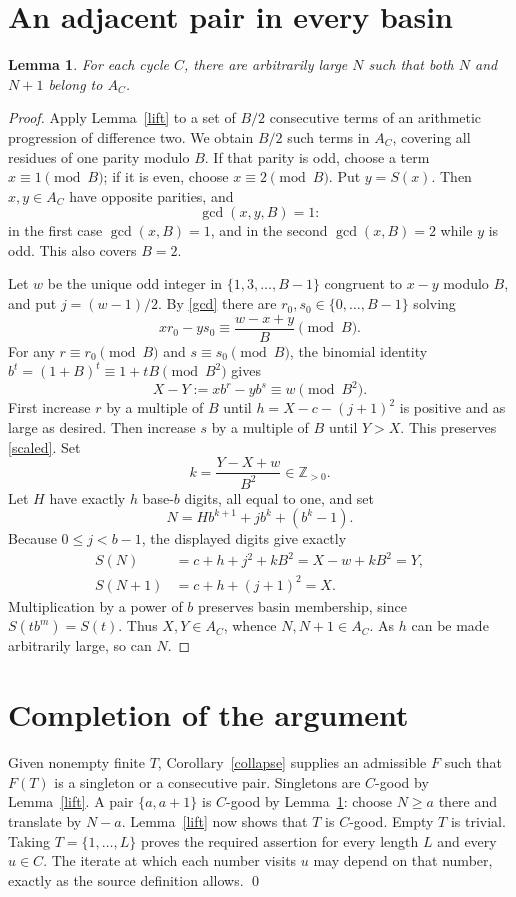 \documentclass[11pt]{article}
\newtheorem{lemma}{Lemma}
\begin{document}
\section*{An adjacent pair in every basin}
\begin{lemma}\label{seed}
For each cycle $C$, there are arbitrarily large $N$ such that both
$N$ and $N+1$ belong to $A_C$.
\end{lemma}
\begin{proof}
Apply Lemma~\ref{lift} to a set of $B/2$ consecutive terms of an
arithmetic progression of difference two. We obtain $B/2$ such terms
in $A_C$, covering all residues of one parity modulo $B$. If that
parity is odd, choose a term $x\equiv1\pmod B$; if it is even, choose
$x\equiv2\pmod B$. Put $y=S(x)$. Then $x,y\in A_C$ have opposite
parities, and
\begin{equation}\label{gcd}
\gcd(x,y,B)=1:
\end{equation}
in the first case $\gcd(x,B)=1$, and in the second $\gcd(x,B)=2$
while $y$ is odd. This also covers $B=2$.

Let $w$ be the unique odd integer in $\{1,3,\ldots,B-1\}$ congruent
to $x-y$ modulo $B$, and put $j=(w-1)/2$. By \eqref{gcd} there are
$r_0,s_0\in\{0,\ldots,B-1\}$ solving
\[
xr_0-ys_0\equiv\frac{w-x+y}{B}\pmod B.
\]
For any $r\equiv r_0\pmod B$ and $s\equiv s_0\pmod B$, the binomial
identity $b^t=(1+B)^t\equiv1+tB\pmod{B^2}$ gives
\begin{equation}\label{scaled}
X-Y:=xb^r-yb^s\equiv w\pmod{B^2}.
\end{equation}
First increase $r$ by a multiple of $B$ until
$h=X-c-(j+1)^2$ is positive and as large as desired. Then increase
$s$ by a multiple of $B$ until $Y>X$. This preserves \eqref{scaled}.
Set
\[
k=\frac{Y-X+w}{B^2}\in\mathbb Z_{>0}.
\]
Let $H$ have exactly $h$ base-$b$ digits, all equal to one, and set
\[
N=Hb^{k+1}+jb^k+(b^k-1).
\]
Because $0\le j<b-1$, the displayed digits give exactly
\begin{align*}
S(N)&=c+h+j^2+kB^2=X-w+kB^2=Y,\\
S(N+1)&=c+h+(j+1)^2=X.
\end{align*}
Multiplication by a power of $b$ preserves basin membership, since
$S(tb^m)=S(t)$. Thus $X,Y\in A_C$, whence $N,N+1\in A_C$.
As $h$ can be made arbitrarily large, so can $N$.
\end{proof}

\section*{Completion of the argument}
Given nonempty finite $T$, Corollary~\ref{collapse} supplies an admissible
$F$ such that $F(T)$ is a singleton or a consecutive pair. Singletons
are $C$-good by Lemma~\ref{lift}. A pair $\{a,a+1\}$ is $C$-good by
Lemma~\ref{seed}: choose $N\ge a$ there and translate by $N-a$.
Lemma~\ref{lift} now shows that $T$ is $C$-good. Empty $T$ is trivial.
Taking $T=\{1,\ldots,L\}$ proves the required assertion for every
length $L$ and every $u\in C$. The iterate at which each number visits
$u$ may depend on that number, exactly as the source definition allows.
\qed
\end{document}
